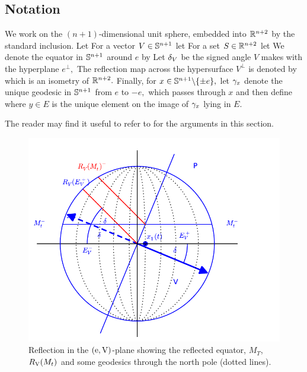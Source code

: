 \documentclass{amsart}
\begin{document}
\subsection{Notation}
We work on the $(n+1)$-dimensional unit sphere, embedded into $\R^{n+2}$ by the standard inclusion.
Let
For a vector $V\in \S^{n+1}$ let
For a set $S\in \R^{n+2}$ let
We denote the equator in $\S^{n+1}$ around $e$ by
Let $\d_{V}$ be the signed angle $V$ makes with the hyperplane $e^{\perp},$
The reflection map across the hypersurface $V^{\perp}$ is denoted by
which is an isometry of $\R^{n+2}.$
Finally, for $x\in \S^{n+1}\bs\{\pm e\},$
let $\g_{x}$ denote the unique geodesic in $\S^{n+1}$ from $e$ to $-e,$ which passes through $x$ and then define
where $y\in E$ is the unique element on the image of $\g_{x}$ lying in $E.$

The reader may find it useful to refer to  for the arguments in this section.
\begin{figure}[htb]
\centering
\includegraphics[width=.9\linewidth]{./reflection.pdf}
\caption{Reflection in the $(\vertvec, \reflectionvector)$-plane showing the reflected equator, \(M_T\), \(\reflectionmap(M_t)\) and some geodesics through the north pole (dotted lines).}
\label{fig:reflection}
\end{figure}
\end{document}
